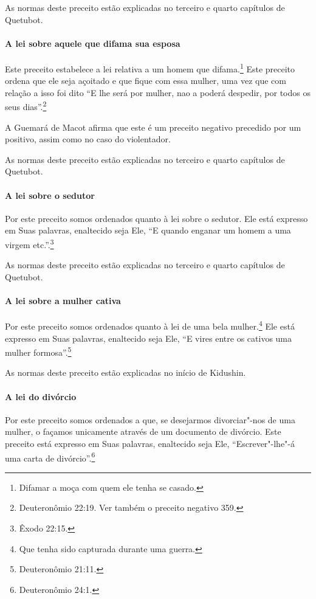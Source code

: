\begin{multicols}{2}
As normas deste preceito estão explicadas no terceiro e quarto
capítulos de Quetubot\starr.

\paragraph{A lei sobre aquele que difama sua esposa}

Este preceito estabelece a lei relativa a um homem que
difama.\footnote{Difamar a moça com quem ele tenha se casado.} Este preceito ordena que ele seja açoitado
e que fique com essa mulher, uma vez que com relação a isso foi dito ``E
lhe será por mulher, nao a poderá despedir, por todos os seus dias''.\footnote{Deuteronômio 22:19. Ver também o preceito negativo 359.}

A Guemará\starr{} de Macot\starr{} afirma que este é um preceito negativo precedido por
um positivo, assim como no caso do violentador.

As normas deste preceito estão explicadas no terceiro e quarto
capítulos de Quetubot\starr.

\paragraph{A lei sobre o sedutor}

Por este preceito somos ordenados quanto à lei sobre o sedutor. Ele está
expresso em Suas palavras, enaltecido seja Ele, ``E quando enganar um
homem a uma virgem etc.''.\footnote{Êxodo 22:15.}

As normas deste preceito estão explicadas no terceiro e quarto
capítulos de Quetubot\starr.

\paragraph{A lei sobre a mulher cativa}

Por este preceito somos ordenados quanto à lei de uma bela
mulher.\footnote{Que tenha sido capturada durante uma guerra.} Ele está expresso em Suas palavras,
enaltecido seja Ele, ``E vires entre os cativos uma mulher formosa''.\footnote{Deuteronômio 21:11.}

As normas deste preceito estão explicadas no início de Kidushin\starr.

\paragraph{A lei do divórcio}

Por este preceito somos ordenados a que, se desejarmos divorciar"-nos de
uma mulher, o façamos unicamente através de um documento de divórcio.
Este preceito está expresso em Suas palavras, enaltecido seja Ele,
``Escrever"-lhe"-á uma carta de divórcio''.\footnote{Deuteronômio 24:1.}


\end{multicols}
